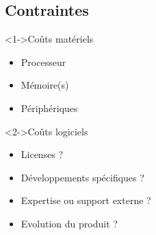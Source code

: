 \subsection{Contraintes}
\begin{frame}[t]
	\begin{block}<1->{Coûts matériels}
		\begin{itemize}
			\item Processeur
			\item Mémoire(s)
			\item Périphériques
		\end{itemize}
	\end{block}
	\begin{block}<2->{Coûts logiciels}
		\begin{itemize}
			\item Licenses ?
			\item Développements spécifiques ?
			\item Expertise ou support externe ?
			\item Evolution du produit ?
		\end{itemize}
	\end{block}
\end{frame}


